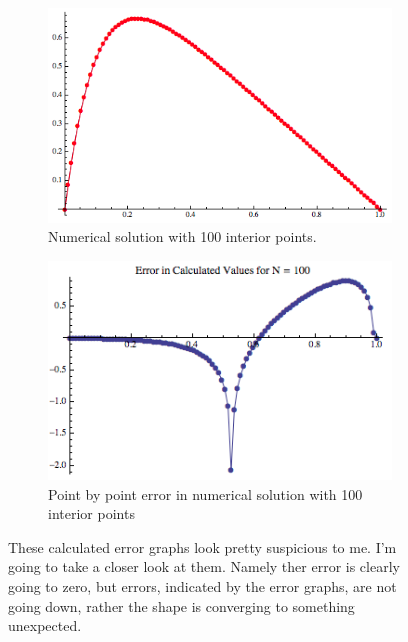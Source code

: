 \documentclass{article}
\begin{document}
\begin{figure}[H]
	\centering
	
	\begin{subfigure}{.5\textwidth}
  		\centering
  		\includegraphics[width=.9\linewidth]{solutionN100}
  		\caption{Numerical solution with 100 interior points. \label{fig: }}
	\end{subfigure}%
	\begin{subfigure}{.5\textwidth}
  		\centering
  		\includegraphics[width=.9\linewidth]{solutionErrorN100}
  		\caption{Point by point error in numerical solution with 100 interior points \label{fig: }}
	\end{subfigure}
	\caption{These calculated error graphs look pretty suspicious to me.  I’m going to take a closer look at them.  Namely ther error is clearly going to zero, but errors, indicated by the error graphs, are not going down, rather the shape is converging to something unexpected.}
\end{figure}
\end{document}

